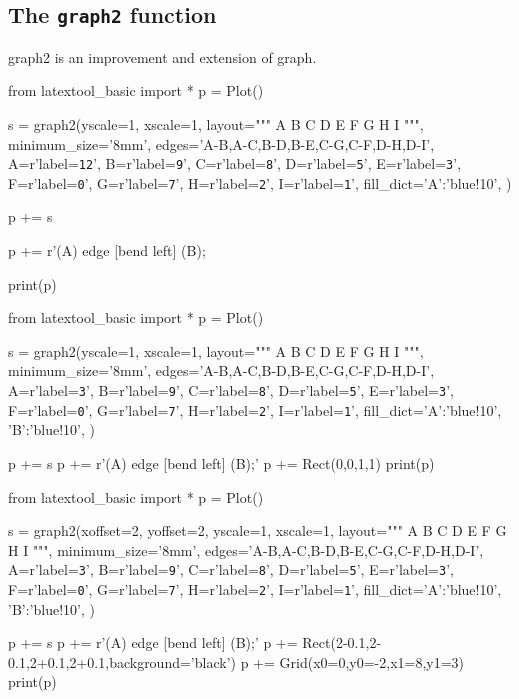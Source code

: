 \subsection{The \texttt{graph2} function}

graph2 is an improvement and extension of graph.

\begin{console}
from latextool_basic import *
p = Plot()

s = graph2(yscale=1, xscale=1,
layout="""
    A 
  B   C 
 D E F G
H I
""",
minimum_size='8mm',
edges='A-B,A-C,B-D,B-E,C-G,C-F,D-H,D-I',
A=r'label=\texttt{12}',
B=r'label=\texttt{9}',
C=r'label=\texttt{8}',
D=r'label=\texttt{5}',
E=r'label=\texttt{3}',
F=r'label=\texttt{0}',
G=r'label=\texttt{7}',
H=r'label=\texttt{2}',
I=r'label=\texttt{1}',
fill_dict={'A':'blue!10'},
)

p += s

p += r'\path[<->,dashed] (A) edge [bend left] (B);

print(p)
\end{console}



\begin{python}
from latextool_basic import *
p = Plot()

s = graph2(yscale=1, xscale=1,
layout="""
    A 
  B   C 
 D E F G
H I
""",
minimum_size='8mm',
edges='A-B,A-C,B-D,B-E,C-G,C-F,D-H,D-I',
A=r'label=\texttt{3}',
B=r'label=\texttt{9}',
C=r'label=\texttt{8}',
D=r'label=\texttt{5}',
E=r'label=\texttt{3}',
F=r'label=\texttt{0}',
G=r'label=\texttt{7}',
H=r'label=\texttt{2}',
I=r'label=\texttt{1}',
fill_dict={'A':'blue!10', 'B':'blue!10'},
)

p += s
p += r' (A) edge [bend left] (B);'
p += Rect(0,0,1,1)
print(p)
\end{python}


\begin{python}
from latextool_basic import *
p = Plot()

s = graph2(xoffset=2, yoffset=2, yscale=1, xscale=1,
layout="""
    A 
  B   C 
 D E F G
H I
""",
minimum_size='8mm',
edges='A-B,A-C,B-D,B-E,C-G,C-F,D-H,D-I',
A=r'label=\texttt{3}',
B=r'label=\texttt{9}',
C=r'label=\texttt{8}',
D=r'label=\texttt{5}',
E=r'label=\texttt{3}',
F=r'label=\texttt{0}',
G=r'label=\texttt{7}',
H=r'label=\texttt{2}',
I=r'label=\texttt{1}',
fill_dict={'A':'blue!10', 'B':'blue!10'},
)

p += s
p += r' (A) edge [bend left] (B);'
p += Rect(2-0.1,2-0.1,2+0.1,2+0.1,background='black')
p += Grid(x0=0,y0=-2,x1=8,y1=3)
print(p)
\end{python}
